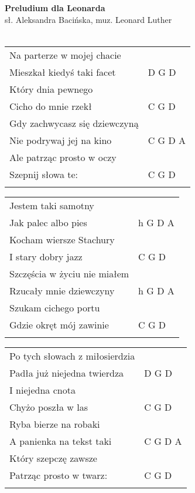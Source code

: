 \documentclass[a5paper]{article}
\begin{document}


\noindent
\fontsize{12pt}{15pt}\selectfont
\textbf{Preludium dla Leonarda} \\
\fontsize{8pt}{10pt}\selectfont
sł. Aleksandra Bacińska, muz. Leonard Luther \\ \\
\fontsize{10pt}{12pt}\selectfont
{}
\begin{tabular}{@{}p{6.50cm}p{3cm}@{}}
\noindent
Na parterze w mojej chacie & \\
Mieszkał kiedyś taki facet & D G D \\
Który dnia pewnego & \\
Cicho do mnie rzekł & C G D \\
Gdy zachwycasz się dziewczyną & \\
Nie podrywaj jej na kino & C G D A \\
Ale patrząc prosto w oczy & \\
Szepnij słowa te: & C G D \\ \\
\end{tabular}

\noindent
\begin{tabular}{@{}p{5.50cm}p{3cm}@{}}
Jestem taki samotny & \\
Jak palec albo pies & h G D A \\
Kocham wiersze Stachury & \\
I stary dobry jazz & C G D \\
Szczęścia w życiu nie miałem & \\
Rzucały mnie dziewczyny & h G D A \\
Szukam cichego portu & \\
Gdzie okręt mój zawinie & C G D \\ \\
\end{tabular}

\noindent
\begin{tabular}{@{}p{6.50cm}p{3cm}@{}}
Po tych słowach z miłosierdzia & \\
Padła już niejedna twierdza & D G D \\
I niejedna cnota & \\
Chyżo poszła w las & C G D \\
Ryba bierze na robaki & \\
A panienka na tekst taki & C G D A \\
Który szepczę zawsze & \\
Patrząc prosto w twarz: & C G D \\ \\
\end{tabular}
\end{document}
